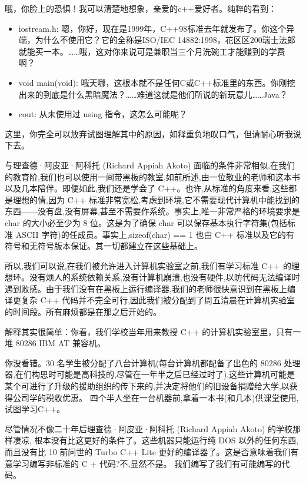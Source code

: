 哦，你脸上的恐惧！我可以清楚地想象，亲爱的c++爱好者。纯粹的看到：

\begin{itemize}
\item 
iostream.h: 嗯，你好，现在是1999年，C++98标准去年就发布了。你这个异端，为什么不使用它？它的全称是ISO/IEC 14882:1998，花区区200瑞士法郎就能买一本。……哦，这对你来说可是兼职当三个月洗碗工才能赚到的学费啊？

\item 
void main(void): 哦天哪，这根本就不是任何C或C++标准里的东西。你刚挖出来的到底是什么黑暗魔法？……难道这就是他们所说的新玩意儿……Java？

\item 
cout: 从未使用过 using 指令，这怎么可能呢？
\end{itemize}

这里，你完全可以放弃试图理解其中的原因，如释重负地叹口气，但请耐心听我说下去。

与理查德·阿皮亚·阿科托 (Richard Appiah Akoto) 面临的条件非常相似,在我们的教育阶,我们也可以使用一间带黑板的教室,如前所述,由一位敬业的老师和这本书以及几本陪伴。即便如此,我们还是学会了 C++。也许,从标准的角度来看,这些都是理想的情,因为 C++ 标准非常宽松,考虑到环境,它不需要现代计算机中能找到的东西——没有盘,没有屏幕,甚至不需要作系统。事实上,唯一非常严格的环境要求是 char 的大小必至少为 8 位。这是为了确保 char 可以保存基本执行字符集(包括标准 ASCII 字符)的任成员。事实上,sizeof(char) == 1 也由 C++ 标准以及它的有符号和无符号版本保证。其一切都建立在这些基础上。

所以,我们可以说,在我们被允许进入计算机实验室之前,我们有学习标准 C++ 的理想环。没有烦人的系统依赖关系,没有计算机崩溃,也没有硬件,以防代码无法编译时遇到败感。由于我们没有在黑板上运行编译器,我们的老师很快意识到在黑板上编译更复杂 C++ 代码并不完全可行,因此我们被分配到了周五清晨在计算机实验室的时间段。所有麻烦都是在那之后开始的。

解释其实很简单：你看，我们学校当年用来教授 C++ 的计算机实验室里，只有一堆 80286 IBM AT 兼容机。

你没看错。30 名学生被分配了八台计算机(每台计算机都配备了出色的 80286 处理器,在们构思时可能是高科技的,尽管在一年半之后已经过时了),这些计算机可能是某个可进行了升级的援助组织的传下来的,并决定将他们的旧设备捐赠给大学,以获得公司学的税收优惠。 四个半人坐在一台机器前,拿着一本书(和几本)供课堂使用,试图学习C++。


尽管情况不像二十年后理查德·阿皮亚·阿科托 (Richard Appiah Akoto) 的学校那样凄凉, 根本没有比这更好的条件了。这些机器只能运行纯 DOS 以外的任何东西,而且没有比 10 前问世的 Turbo C++ Lite 更好的编译器了。这是否意味着我们有意学习编写非标准的 C + 代码?不,显然不是。 我们编写了我们有可能编写的代码。

